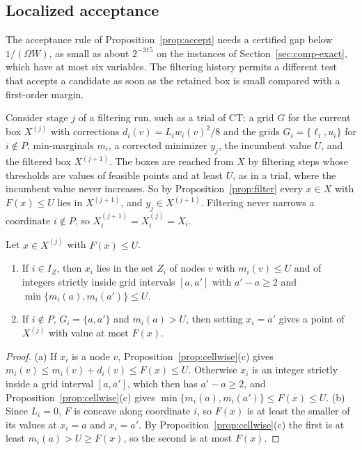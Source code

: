 \subsection{Localized acceptance}\label{sec:localized}
The acceptance rule of Proposition~\ref{prop:accept} needs a certified gap
below $1/(\Omega W)$, as small as about $2^{-315}$ on the instances of
Section~\ref{sec:comp-exact}, which have at most six variables. The filtering
history permits a different test that accepts a candidate as soon as the retained box
is small compared with a first-order margin.

Consider stage $j$ of a filtering run, such as a trial of CT: a grid $G$ for
the current box $X^{(j)}$ with corrections $d_i(v)=L_iw_i(v)^2/8$ and the
grids $G_i=\{\ell_i,u_i\}$ for $i\notin P$, min-marginals $m_i$, a corrected
minimizer $y_j$, the incumbent value $U$, and the filtered box $X^{(j+1)}$.
The boxes are reached from $X$ by filtering steps whose thresholds are values
of feasible points and at least $U$, as in a trial, where the incumbent value
never increases. So by Proposition~\ref{prop:filter} every $x\in X$ with
$F(x)\le U$ lies in $X^{(j+1)}$, and $y_j\in X^{(j+1)}$. Filtering never
narrows a coordinate $i\notin P$, so $X^{(j+1)}_i=X^{(j)}_i=X_i$.

\begin{lemma}\label{lem:node}
Let $x\in X^{(j)}$ with $F(x)\le U$.
\begin{enumerate}[label=(\alph*)]
\item If $i\in I_Z$, then $x_i$ lies in the set $Z_i$ of nodes $v$ with
$m_i(v)\le U$ and of integers strictly inside grid intervals $[a,a']$ with
$a'-a\ge2$ and $\min\{m_i(a),m_i(a')\}\le U$.
\item If $i\notin P$, $G_i=\{a,a'\}$ and $m_i(a)>U$, then setting $x_i=a'$
gives a point of $X^{(j)}$ with value at most $F(x)$.
\end{enumerate}
\end{lemma}

\begin{proof}
(a) If $x_i$ is a node $v$, Proposition~\ref{prop:cellwise}(c) gives
$m_i(v)\le m_i(v)+d_i(v)\le F(x)\le U$. Otherwise $x_i$ is an integer strictly
inside a grid interval $[a,a']$, which then has $a'-a\ge2$, and
Proposition~\ref{prop:cellwise}(c) gives $\min\{m_i(a),m_i(a')\}\le F(x)\le U$.
(b) Since $L_i=0$, $F$ is concave along coordinate $i$, so $F(x)$ is at least
the smaller of its values at $x_i=a$ and $x_i=a'$. By
Proposition~\ref{prop:cellwise}(c) the first is at least $m_i(a)>U\ge F(x)$,
so the second is at most $F(x)$.
\end{proof}


